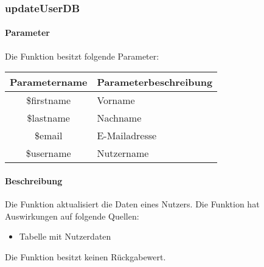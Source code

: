 \subsubsection{updateUserDB}
\paragraph{Parameter} Die Funktion besitzt folgende Parameter:
\begin{table}[H]
	\begin{tabular}{|c|p{11cm}|}
		\hline
		\textbf{Parametername} & \textbf{Parameterbeschreibung} \\ \hline
		\$firstname & Vorname \\ \hline
		\$lastname  & Nachname \\ \hline
		\$email     & E-Mailadresse \\ \hline
		\$username  & Nutzername \\ \hline
	\end{tabular}
\end{table}
\paragraph{Beschreibung} Die Funktion aktualisiert die Daten eines Nutzers. Die Funktion hat Auswirkungen auf folgende Quellen:
\begin{itemize}
	\item Tabelle mit Nutzerdaten
\end{itemize}
Die Funktion besitzt keinen Rückgabewert.